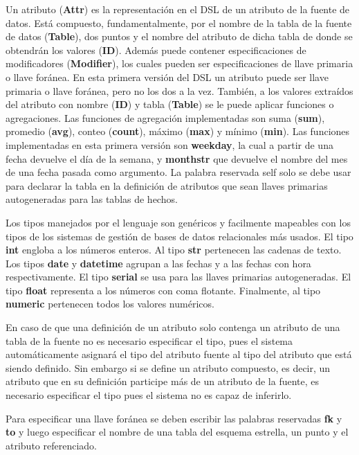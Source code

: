 Un atributo (\textbf{Attr}) es la representaci\'on en el DSL de un atributo de la fuente de datos. Est\'a compuesto, 
fundamentalmente, 
por el nombre de la tabla de la fuente de datos (\textbf{Table}), dos puntos y el nombre del atributo de dicha tabla 
de donde se obtendr\'an los valores (\textbf{ID}). Adem\'as puede contener especificaciones de modificadores (\textbf{Modifier}), 
los cuales pueden ser especificaciones de llave primaria o llave for\'anea. En esta primera versi\'on del 
DSL un atributo puede ser llave primaria o llave for\'anea, pero no los dos a la vez. Tambi\'en, a los valores
extra\'idos del atributo con nombre (\textbf{ID}) y tabla (\textbf{Table}) se le puede aplicar funciones o agregaciones. Las 
funciones de agregaci\'on implementadas son suma (\textbf{sum}), promedio (\textbf{avg}), conteo (\textbf{count}), m\'aximo (\textbf{max}) y 
m\'inimo (\textbf{min}). Las funciones implementadas en esta primera versi\'on son \textbf{weekday}, la cual a partir de 
una fecha devuelve el d\'ia de la semana, y \textbf{monthstr} que devuelve el nombre del mes de una fecha pasada 
como argumento. La palabra reservada self solo se debe usar para declarar la tabla en la definición de atributos 
que sean llaves primarias autogeneradas para las tablas de hechos.

Los tipos manejados por el lenguaje son gen\'ericos y facilmente mapeables con los tipos de los sistemas de 
gesti\'on de bases de datos relacionales m\'as usados. El tipo \textbf{int} engloba a los n\'umeros enteros. 
Al tipo \textbf{str} pertenecen las cadenas de texto. Los tipos \textbf{date} y \textbf{datetime} agrupan a las fechas y a las fechas con 
hora respectivamente. El tipo \textbf{serial} se usa para las llaves primarias autogeneradas. El tipo \textbf{float} 
representa a los n\'umeros con coma flotante. Finalmente, al tipo \textbf{numeric} pertenecen todos los valores numéricos.

En caso de que una definición de un atributo solo contenga un atributo de una tabla de la fuente no es necesario 
especificar el tipo, pues el sistema autom\'aticamente asignar\'a el tipo del atributo fuente al tipo del 
atributo que est\'a siendo definido. Sin embargo si se define un atributo compuesto, es decir, un atributo que 
en su definición participe m\'as de un atributo de la fuente, es necesario especificar el tipo pues el sistema 
no es capaz de inferirlo.

Para especificar una llave for\'anea se deben escribir las palabras reservadas \textbf{fk} y \textbf{to} y luego especificar 
el nombre de una tabla del esquema estrella, un punto y el atributo referenciado.

